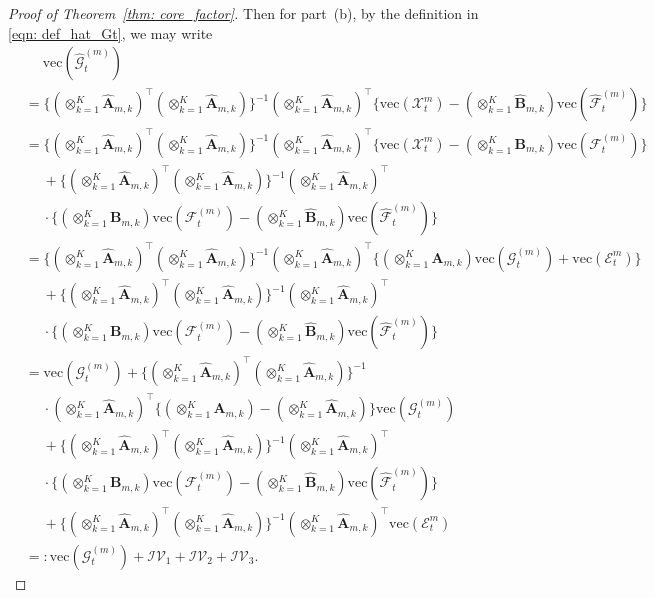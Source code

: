\documentclass[aos]{imsart}
\theoremstyle{plain}
\theoremstyle{definition}
\def\wh#1{\widehat{#1}}
\def\cE{\mathcal{E}}
\def\cF{\mathcal{F}}
\def\cG{\mathcal{G}} \def\cH{\boldsymbol{\mathcal{H}}} \def\cI{\mathcal{I}}
\def\cIV{\mathcal{IV}}
\def\cX{\mathcal{X}}
\def\bA{\mathbf{A}}
\def\bB{\mathbf{B}}
\def\trans{\intercal}
\def\vec{\mathrm{vec}}
\begin{document}
\begin{proof}[Proof of Theorem~\ref{thm: core_factor}]
Then for part~(b), by the definition in \eqref{eqn: def_hat_Gt}, we may write
\begin{align*}
    &\;\quad
    \vec(\wh{\cG}_t^{(m)}) \\
    &=
    \Big\{ (\otimes_{k=1}^K \wh{\bA}_{m,k})^\trans (\otimes_{k=1}^K \wh{\bA}_{m,k}) \Big\}^{-1} (\otimes_{k=1}^K \wh{\bA}_{m,k})^\trans \Big\{ \vec(\cX_t^{m}) - (\otimes_{k=1}^K \wh{\bB}_{m,k}) \vec(\wh\cF_t^{(m)}) \Big\} \\
    &=
    \Big\{ (\otimes_{k=1}^K \wh{\bA}_{m,k})^\trans (\otimes_{k=1}^K \wh{\bA}_{m,k}) \Big\}^{-1} (\otimes_{k=1}^K \wh{\bA}_{m,k})^\trans \Big\{ \vec(\cX_t^{m}) - (\otimes_{k=1}^K \bB_{m,k}) \vec(\cF_t^{(m)}) \Big\} \\
    &\;\quad
    + \Big\{ (\otimes_{k=1}^K \wh{\bA}_{m,k})^\trans (\otimes_{k=1}^K \wh{\bA}_{m,k}) \Big\}^{-1} (\otimes_{k=1}^K \wh{\bA}_{m,k})^\trans \\
    &\;\quad
    \cdot \Big\{ (\otimes_{k=1}^K \bB_{m,k}) \vec(\cF_t^{(m)}) - (\otimes_{k=1}^K \wh{\bB}_{m,k}) \vec(\wh\cF_t^{(m)}) \Big\} \\
    &=
    \Big\{ (\otimes_{k=1}^K \wh{\bA}_{m,k})^\trans (\otimes_{k=1}^K \wh{\bA}_{m,k}) \Big\}^{-1} (\otimes_{k=1}^K \wh{\bA}_{m,k})^\trans \Big\{ (\otimes_{k=1}^K \bA_{m,k}) \vec(\cG_t^{(m)}) + \vec(\cE_t^{m}) \Big\} \\
    &\;\quad
    + \Big\{ (\otimes_{k=1}^K \wh{\bA}_{m,k})^\trans (\otimes_{k=1}^K \wh{\bA}_{m,k}) \Big\}^{-1} (\otimes_{k=1}^K \wh{\bA}_{m,k})^\trans \\
    &\;\quad
    \cdot \Big\{ (\otimes_{k=1}^K \bB_{m,k}) \vec(\cF_t^{(m)}) - (\otimes_{k=1}^K \wh{\bB}_{m,k}) \vec(\wh\cF_t^{(m)}) \Big\} \\
    &=
    \vec(\cG_t^{(m)}) + \Big\{ (\otimes_{k=1}^K \wh{\bA}_{m,k})^\trans (\otimes_{k=1}^K \wh{\bA}_{m,k}) \Big\}^{-1} \\
    &\;\quad
    \cdot (\otimes_{k=1}^K \wh{\bA}_{m,k})^\trans \Big\{ (\otimes_{k=1}^K \bA_{m,k}) -(\otimes_{k=1}^K \wh{\bA}_{m,k}) \Big\} \vec(\cG_t^{(m)}) \\
    &\;\quad
    + \Big\{ (\otimes_{k=1}^K \wh{\bA}_{m,k})^\trans (\otimes_{k=1}^K \wh{\bA}_{m,k}) \Big\}^{-1} (\otimes_{k=1}^K \wh{\bA}_{m,k})^\trans \\
    &\;\quad
    \cdot \Big\{ (\otimes_{k=1}^K \bB_{m,k}) \vec(\cF_t^{(m)}) - (\otimes_{k=1}^K \wh{\bB}_{m,k}) \vec(\wh\cF_t^{(m)}) \Big\} \\
    &\;\quad
    + \Big\{ (\otimes_{k=1}^K \wh{\bA}_{m,k})^\trans (\otimes_{k=1}^K \wh{\bA}_{m,k}) \Big\}^{-1} (\otimes_{k=1}^K \wh{\bA}_{m,k})^\trans \vec(\cE_t^{m}) \\
    &=: \vec(\cG_t^{(m)}) + \cIV_1 + \cIV_2 + \cIV_3 .
\end{align*}


\end{proof}
\end{document}
